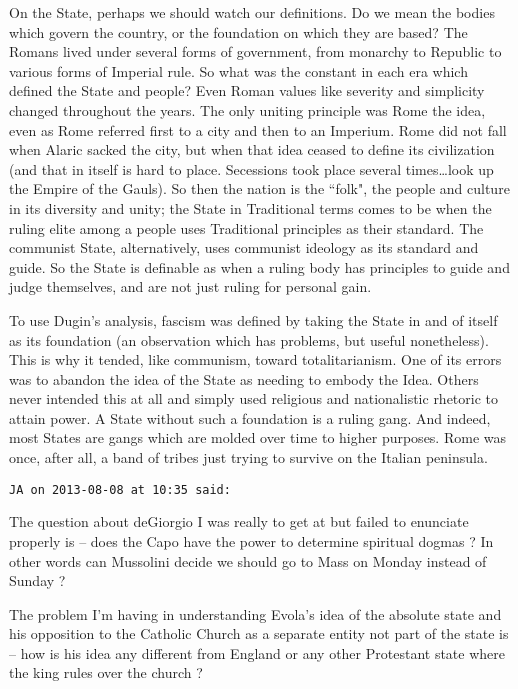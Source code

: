 \begin{footnotesize}
\begin{sffamily}
On the State, perhaps we should watch our definitions. Do we mean the bodies which govern the country, or the foundation on which they are based? The Romans lived under several forms of government, from monarchy to Republic to various forms of Imperial rule. So what was the constant in each era which defined the State and people? Even Roman values like severity and simplicity changed throughout the years. The only uniting principle was Rome the idea, even as Rome referred first to a city and then to an Imperium. Rome did not fall when Alaric sacked the city, but when that idea ceased to define its civilization (and that in itself is hard to place. Secessions took place several times…look up the Empire of the Gauls). So then the nation is the ``folk", the people and culture in its diversity and unity; the State in Traditional terms comes to be when the ruling elite among a people uses Traditional principles as their standard. The communist State, alternatively, uses communist ideology as its standard and guide. So the State is definable as when a ruling body has principles to guide and judge themselves, and are not just ruling for personal gain. 

To use Dugin's analysis, fascism was defined by taking the State in and of itself as its foundation (an observation which has problems, but useful nonetheless). This is why it tended, like communism, toward totalitarianism. One of its errors was to abandon the idea of the State as needing to embody the Idea. Others never intended this at all and simply used religious and nationalistic rhetoric to attain power. A State without such a foundation is a ruling gang. And indeed, most States are gangs which are molded over time to higher purposes. Rome was once, after all, a band of tribes just trying to survive on the Italian peninsula.


\hfill

\texttt{JA on 2013-08-08 at 10:35 said: }

The question about deGiorgio I was really to get at but failed to enunciate properly is – does the Capo have the power to determine spiritual dogmas ? In other words can Mussolini decide we should go to Mass on Monday instead of Sunday ? 

The problem I'm having in understanding Evola's idea of the absolute state and his opposition to the Catholic Church as a separate entity not part of the state is – how is his idea any different from England or any other Protestant state where the king rules over the church ?



\end{sffamily}
\end{footnotesize}
